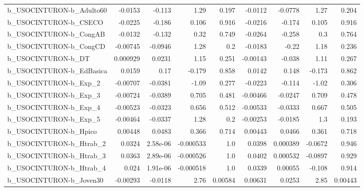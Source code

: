 \begin{tabular}{lrrrrrrrr}
b\_USOCINTURON-b\_Adulto60   &     -0.0153 &       -0.113 &      1.29 &    0.197 &    -0.0112 &     -0.0778 &         1.27 &         0.204 \\
b\_USOCINTURON-b\_CSECO      &     -0.0225 &       -0.186 &     0.106 &    0.916 &    -0.0216 &      -0.174 &        0.105 &         0.916 \\
b\_USOCINTURON-b\_CongAB     &     -0.0132 &       -0.132 &      0.32 &    0.749 &    -0.0264 &      -0.258 &          0.3 &         0.764 \\
b\_USOCINTURON-b\_CongCD     &    -0.00745 &      -0.0946 &      1.28 &      0.2 &    -0.0183 &       -0.22 &         1.18 &         0.236 \\
b\_USOCINTURON-b\_DT         &    0.000929 &       0.0231 &      1.15 &    0.251 &   -0.00143 &      -0.038 &         1.11 &         0.267 \\
b\_USOCINTURON-b\_EdBasica   &      0.0159 &         0.17 &    -0.179 &    0.858 &     0.0142 &       0.148 &       -0.173 &         0.862 \\
b\_USOCINTURON-b\_Exp\_2      &    -0.00707 &      -0.0381 &     -1.09 &    0.277 &    -0.0223 &      -0.114 &        -1.02 &         0.306 \\
b\_USOCINTURON-b\_Exp\_3      &    -0.00724 &      -0.0389 &     0.705 &    0.481 &   -0.00466 &     -0.0247 &        0.709 &         0.478 \\
b\_USOCINTURON-b\_Exp\_4      &    -0.00523 &      -0.0323 &     0.656 &    0.512 &   -0.00533 &     -0.0333 &        0.667 &         0.505 \\
b\_USOCINTURON-b\_Exp\_5      &    -0.00464 &      -0.0337 &      1.28 &      0.2 &   -0.00253 &     -0.0185 &          1.3 &         0.193 \\
b\_USOCINTURON-b\_Hpico      &     0.00448 &       0.0483 &     0.366 &    0.714 &    0.00443 &      0.0466 &        0.361 &         0.718 \\
b\_USOCINTURON-b\_Htrab\_2    &      0.0324 &     2.58e-06 & -0.000533 &      1.0 &     0.0398 &    0.000389 &      -0.0672 &         0.946 \\
b\_USOCINTURON-b\_Htrab\_3    &      0.0363 &     2.89e-06 & -0.000526 &      1.0 &     0.0402 &    0.000532 &      -0.0897 &         0.929 \\
b\_USOCINTURON-b\_Htrab\_4    &       0.024 &     1.91e-06 & -0.000518 &      1.0 &     0.0339 &     0.00055 &       -0.108 &         0.914 \\
b\_USOCINTURON-b\_Joven30    &    -0.00293 &      -0.0118 &      2.76 &  0.00584 &    0.00631 &      0.0253 &         2.85 &       0.00443 \\

\end{tabular}
